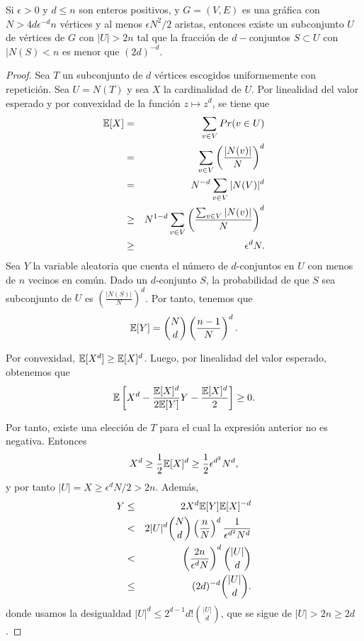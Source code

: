\begin{theorem}
Si $\epsilon > 0$ y $d\leq n$ son enteros positivos, y $G = (V, E)$
es una gráfica con
$N > 4d\epsilon^{-d}n$ vértices y al menos $\epsilon N^2 / 2$
aristas, entonces existe un
subconjunto $U$ de vértices de $G$ con $\vert U \vert > 2n$ tal que
la fracción de $d-$conjuntos $S \subset U$ con $\vert N(S) < n$ es
menor que $(2d)^{-d}$.
\end{theorem}
\begin{proof}
Sea $T$ un subconjunto de $d$ vértices escogidos uniformemente con
repetición. Sea
$U = N(T)$ y sea $X$ la cardinalidad de $U$. Por linealidad del valor
esperado y por
convexidad de la función $z \mapsto z^d$, se tiene que
\begin{eqnarray*}
  \mathbb{E}[X] &=& \sum_{v \in V}Pr(v \in U)\\
  &=& \sum_{v \in V}\left(\frac{\vert N(v) \vert}{N}\right)^d\\
  &=& N^{-d}\sum_{v \in V} \vert N(V) \vert^d \\
  &\ge& N^{1-d}\sum_{v \in V} \left( \frac{\sum_{v \in V}\vert
  N(v)\vert}{N} \right)^d\\
  &\ge& \epsilon^dN.
\end{eqnarray*}
Sea $Y$ la variable aleatoria que cuenta el número de $d$-conjuntos
en $U$ con menos de
$n$ vecinos en común. Dado un $d$-conjunto $S$, la probabilidad de
que $S$ sea subconjunto de $U$
es $\left(\frac{\vert N(S)\vert}{N} \right)^d$. Por tanto, tenemos que
$$\mathbb{E}[Y] = \binom{N}{d} \left( \frac{n-1}{N} \right)^d.$$

Por convexidad, $\mathbb{E}[X^d] \ge \mathbb{E}[X]^d$. Luego, por linealidad del
valor esperado, obtenemos que
$$\mathbb{E}\left[X^d - \frac{\mathbb{E}[X]^d}{2 \mathbb{E}[Y]} Y - \frac{\mathbb{E}[X]^d}{2} \right] \ge 0.$$

Por tanto, existe una elección de $T$ para el cual la expresión
anterior no es negativa. Entonces
$$X^d \ge \frac{1}{2} \mathbb{E}[X]^d \ge \frac{1}{2}\epsilon^{d^2} N^d, $$
y por tanto $\vert U \vert = X \ge \epsilon^d N / 2 > 2n.$ Además,
\begin{eqnarray*}
  Y &\le& 2X^d\mathbb{E}[Y]\mathbb{E}[X]^{-d} \\
  &<& 2 \vert U \vert^d \binom{N}{d}\left( \frac{n}{N} \right)^d
  \frac{1}{\epsilon^{d^2} N^d}\\
  &<& \left( \frac{2n}{\epsilon^d N} \right)^d \binom{\vert U \vert}{d} \\
  &\le& (2d)^{-d} \binom{\vert U \vert}{d}.
\end{eqnarray*}
donde usamos la desigualdad $\vert U \vert^d \le 2^{d-1} d!
\binom{\vert U \vert}{d}$, que se sigue de $\vert U \vert > 2n \ge 2d$.
\end{proof}
